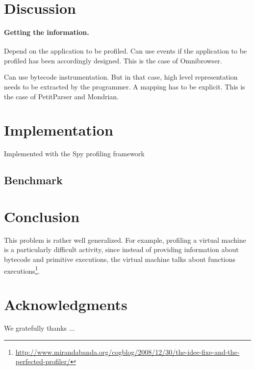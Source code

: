 \documentclass[runningheads]{llncs}
\newcommand{\seclabel}[1]{\label{sec:#1}}
\begin{document}
\section{Discussion}\seclabel{discussion}

\paragraph{Getting the information.} 
Depend on the application to be profiled. 
Can use events if the application to be profiled has been accordingly designed. This is the case of Omnibrowser. 

Can use bytecode instrumentation. But in that case, high level representation needs to be extracted by the programmer. A mapping has to be explicit. This is the case of PetitParser and Mondrian.




\section{Implementation}\seclabel{implementation}

Implemented with the Spy profiling framework

\subsection{Benchmark}	
	
\section{Conclusion}\seclabel{conclusion}

This problem is rather well generalized. For example, profiling a virtual machine is a particularly difficult activity, since instead of providing information about bytecode and primitive executions, the virtual machine talks about functions executions\footnote{\url{http://www.mirandabanda.org/cogblog/2008/12/30/the-idee-fixe-and-the-perfected-profiler/}}.

\section*{Acknowledgments}

\small We gratefully thanks ...



\end{document}
